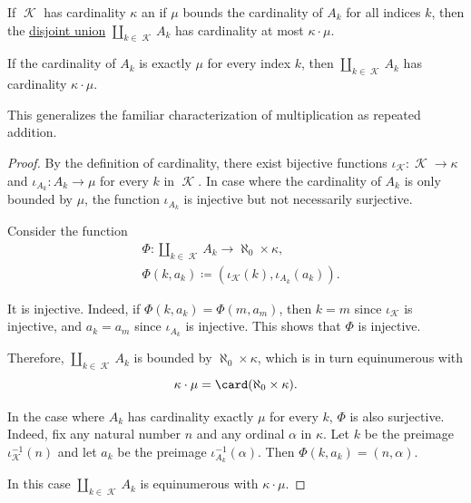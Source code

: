 \begin{proposition}\label{thm:cardinality_of_disjoint_union}
  If \( \mscrK \) has cardinality \( \kappa \) an if \( \mu \) bounds the cardinality of \( A_k \) for all indices \( k \), then the \hyperref[def:disjoint_union]{disjoint union} \( \coprod_{k \in \mscrK} A_k \) has cardinality at most \( \kappa \cdot \mu \).

  If the cardinality of \( A_k \) is exactly \( \mu \) for every index \( k \), then \( \coprod_{k \in \mscrK} A_k \) has cardinality \( \kappa \cdot \mu \).
\end{proposition}
\begin{comments}
  \item This generalizes the familiar characterization of multiplication as repeated addition.
\end{comments}
\begin{proof}
  By the definition of cardinality, there exist bijective functions \( \iota_\mscrK: \mscrK \to \kappa \) and \( \iota_{A_k}: A_k \to \mu \) for every \( k \) in \( \mscrK \). In case where the cardinality of \( A_k \) is only bounded by \( \mu \), the function \( \iota_{A_k} \) is injective but not necessarily surjective.

  Consider the function
  \begin{equation*}
    \begin{aligned}
      &\Phi:\coprod_{k \in \mscrK} A_k \to \aleph_0 \times \kappa, \\
      &\Phi(k, a_k) \coloneqq (\iota_\mscrK(k), \iota_{A_k}(a_k)).
    \end{aligned}
  \end{equation*}

  It is injective. Indeed, if \( \Phi(k, a_k) = \Phi(m, a_m) \), then \( k = m \) since \( \iota_\mscrK \) is injective, and \( a_k = a_m \) since \( \iota_{A_k} \) is injective. This shows that \( \Phi \) is injective.

  Therefore, \( \coprod_{k \in \mscrK} A_k \) is bounded by \( \aleph_0 \times \kappa \), which is in turn equinumerous with
  \begin{equation*}
    \kappa \cdot \mu = \card(\aleph_0 \times \kappa).
  \end{equation*}

  In the case where \( A_k \) has cardinality exactly \( \mu \) for every \( k \), \( \Phi \) is also surjective. Indeed, fix any natural number \( n \) and any ordinal \( \alpha \) in \( \kappa \). Let \( k \) be the preimage \( \iota_\mscrK^{-1}(n) \) and let \( a_k \) be the preimage \( \iota_{A_k}^{-1}(\alpha) \). Then \( \Phi(k, a_k) = (n, \alpha) \).

  In this case \( \coprod_{k \in \mscrK} A_k \) is equinumerous with \( \kappa \cdot \mu \).
\end{proof}


